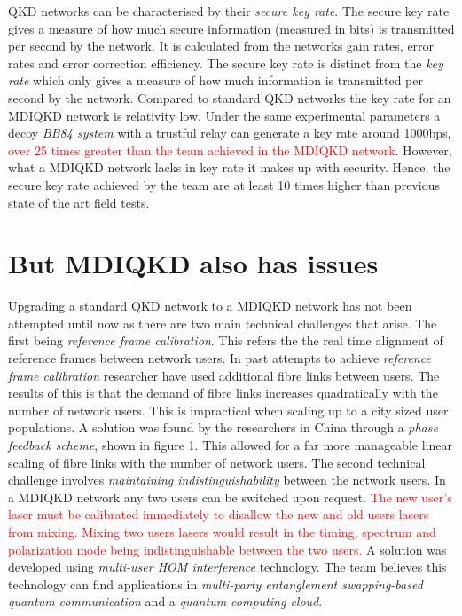 \documentclass[journal]{vgtc}
\begin{document}
QKD networks can be characterised by their \textit{secure key rate}.  The secure key rate gives a measure of how much secure information (measured in bits) is transmitted per second by the network. It is calculated from the networks gain rates, error rates and error correction efficiency. The secure key rate is distinct from the \textit{key rate} which only gives a measure of how much information is transmitted per second by the network. Compared to standard QKD networks the key rate for an MDIQKD network is relativity low. Under the same experimental parameters a decoy \textit{BB84 system} with a trustful relay can generate a key rate around 1000bps, \textcolor{red}{over 25 times greater than the team achieved in the MDIQKD network}. However, what a MDIQKD network lacks in key rate it makes up with security. Hence, the secure key rate achieved by the team are at least 10 times higher than previous state of the art field tests.

\section{But MDIQKD also has issues}

Upgrading a standard QKD network to a MDIQKD network has not been attempted until now as there are two main technical challenges that arise. The first being \textit{reference frame calibration}. This refers the the real time alignment of reference frames between network users. In past attempts to achieve \textit{reference frame calibration} researcher have used additional fibre links between users. The results of this is that the demand of fibre links increases quadratically with the number of network users. This is impractical when scaling up to a city sized user populations. A solution was found by the researchers in China through a \textit{phase feedback scheme}, shown in figure 1. This allowed for a far more manageable linear scaling of fibre links with the number of network users. The second technical challenge involves \textit{maintaining indistinguishability} between the network users. In a MDIQKD network any two users can be switched upon request. \textcolor{red}{ The new user's laser must be calibrated immediately to disallow the new and old users lasers from mixing. Mixing two users lasers would result in the timing, spectrum and polarization mode being indistinguishable between the two users.} A solution was developed using \textit{multi-user HOM interference} technology. The team believes this technology can find applications in \textit{multi-party entanglement swapping-based quantum communication} and a \textit{quantum computing cloud}.
\end{document}
